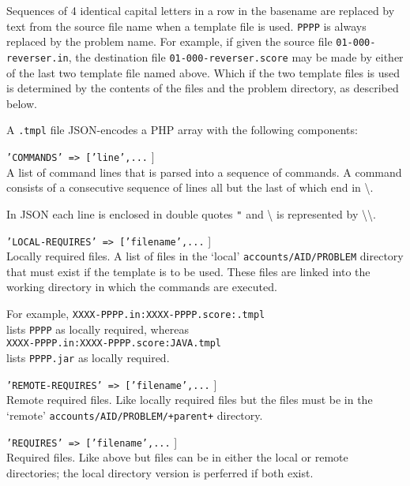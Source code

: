 \documentclass[12pt]{article}
\newenvironment{indpar}[1][0.4in]%
	{\begin{list}{}%
		     {\setlength{\itemsep}{0in}%
		      \setlength{\topsep}{0in}%
		      \setlength{\parsep}{1ex}%
		      \setlength{\labelwidth}{#1}%
		      \setlength{\leftmargin}{#1}%
		      \addtolength{\leftmargin}{\labelsep}}%
	 \item}%
	{\end{list}}
\newenvironment{itemlist}[1][0.2in]%
	{\begin{list}{}{\setlength{\labelwidth}{#1}%
		        \setlength{\leftmargin}{\labelwidth}%
		        \addtolength{\leftmargin}{+0.2in}%
		        \addtolength{\linewidth}{-\labelwidth}%
		        \addtolength{\linewidth}{-0.2in}%
		        \renewcommand{\makelabel}[1]{##1\hfill}}
	 \raggedright}%
	{\end{list}}
\newcommand{\BSL}{\textbackslash}
\begin{document}
Sequences of 4 identical capital letters in a row in the basename
are replaced by text from the source file name when a template
file is used.  {\tt PPPP} is always replaced by the problem name.
For example, if given the source file {\tt 01-000-reverser.in},
the destination file {\tt 01-000-reverser.score} may be made
by either of the last two template file named above.
Which if the two template files is used is determined by the
contents of the files and the problem directory, as described
below.

A {\tt .tmpl} file JSON-encodes a PHP array with the following
components:
\begin{indpar}[0.2in]
\begin{itemlist}
\item[\tt 'COMMANDS' => ['line',...]] ~
\label{TEMPLATE-COMMANDS} \\
A list of command lines that is parsed into a sequence of commands.
A command consists of a consecutive sequence of lines all but the
last of which end in \BSL.

In JSON each line is enclosed in double quotes \verb|"| and \BSL
is represented by \BSL\BSL.

\item[\tt 'LOCAL-REQUIRES' => ['filename',...]] ~ \\
Locally required files.
A list of files in the `local' {\tt accounts/AID/PROBLEM} directory that must
exist if the template is to be used.  These files
are linked into the working directory in which
the commands are executed.

For example, {\tt XXXX-PPPP.in:XXXX-PPPP.score:.tmpl} \\
lists {\tt PPPP} as locally required, whereas \\
{\tt XXXX-PPPP.in:XXXX-PPPP.score:JAVA.tmpl} \\
lists {\tt PPPP.jar} as locally required.


\item[\tt 'REMOTE-REQUIRES' => ['filename',...]] ~ \\
Remote required files.  Like locally required files but the
files must be in the `remote'
{\tt accounts/AID/PROBLEM/+parent+} directory.

\item[\tt 'REQUIRES' => ['filename',...]] ~ \\
Required files.  Like above but files can be in either the local
or remote directories; the local directory version is perferred if
both exist.


\end{itemlist}
\end{indpar}
\end{document}
